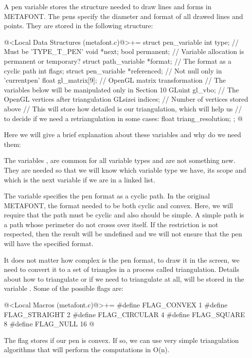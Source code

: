 A pen variable stores the structure needed to draw lines and forms in
METAFONT. The pens specify the diameter and format of all drawed lines
and points. They are stored in the following structure:

\iniciocodigo
@<Local Data Structures (metafont.c)@>+=
struct pen_variable{
  int type; // Must be 'TYPE_T_PEN'
  void *next;
  bool permanent; // Variable allocation is permanent or temporary?
  struct path_variable *format; // The format as a cyclic path
  int flags;
  struct pen_variable *referenced; // Not null only in 'currentpen'
  float gl_matrix[9]; // OpenGL matrix transformation
  // The variables below will be manipulated only in Section 10
  GLuint gl_vbo; // The OpenGL vertices after triangulation
  GLsizei indices; // Number of vertices stored above
  // This will store how detailed is our triangulation, which will help us
  // to decide if we need a retriangulation in some cases:
  float triang_resolution;
};
@
\fimcodigo

Here we will give a brief explanation about these variables and why do
we need them:

The variables , 
are  common for all variable types and are not
something new. They are needed so that we will know which variable
type we have, its scope and which is the next variable if we are in a
linked list.

The variable  specifies the pen format as a cyclic
path. In the original METAFONT, the format needed to be both cyclic
and convex. Here, we will require that the path must be cyclic and
also should be simple. A simple path is a path whose perimeter do not
crosss over itself. If the restriction is not respected, then the
result will be undefined and we will not ensure that the pen will have
the specified format.

It does not matter how complex is the pen format, to draw it in the
screen, we need to convert it to a set of triangles in a process
called triangulation. Details about how to triangulate or if we need
to triangulate at all, will be stored in the
variable . Some of the possible flags are:

\iniciocodigo
@<Local Macros (metafont.c)@>+=
#define FLAG_CONVEX   1
#define FLAG_STRAIGHT 2
#define FLAG_CIRCULAR 4
#define FLAG_SQUARE   8
#define FLAG_NULL    16
@
\fimcodigo

The flag  stores if our pen is convex. If so,
we can use very simple triangulation algorithms that will perform the
computations in O(n).

